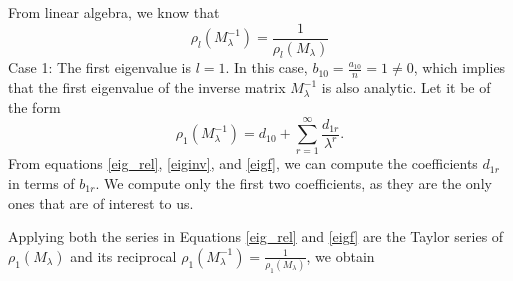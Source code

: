 \documentclass[multixcb]{amstext-l}
\theoremstyle{plain}
\theoremstyle{definition}
\theoremstyle{definition}
\theoremstyle{remark}
\numberwithin{equation}{chapter}
\begin{document}
From linear algebra, we know that \begin{equation}\label{eiginv}
\rho_l(M_{\lambda}^{-1}) = \frac{1}{\rho_l(M_{\lambda})}
\end{equation}
Case 1: The first eigenvalue is $l=1$. In this case, $b_{10} = \frac{a_{10}}{n} = 1\ne 0$, 
which implies that the first eigenvalue of the inverse matrix $M_{\lambda}^{-1}$ is also analytic. Let it be of the form \begin{equation}\label{eigf}
\rho_1(M_{\lambda}^{-1}) = d_{10} + \sum\limits_{r=1}^{\infty}\frac{d_{1r}}{\lambda^r}.
\end{equation}
              From equations \ref{eig_rel}, \ref{eiginv}, and \ref{eigf}, we can compute the coefficients $d_{1r}$ in terms of $b_{1r}$. We compute only the first two coefficients, as they are the only ones that are of interest to us.

Applying both the series in Equations \ref{eig_rel} and \ref{eigf} are the Taylor series of $\rho_1(M_{\lambda})$ and its reciprocal $\rho_1(M_{\lambda}^{-1}) = \frac{1}{\rho_1(M_{\lambda})}$, we obtain
\end{document}
